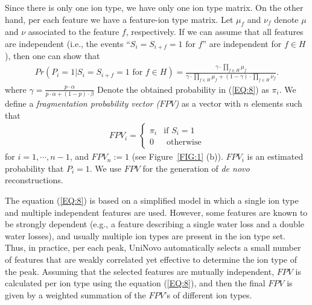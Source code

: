 Since there is only one ion type, we have only one ion type matrix.  On the other hand, per each feature we have a feature-ion type matrix. Let $\mu_f$ and $\nu_f$ denote $\mu$ and $\nu$ associated to the feature $f$, respectively. If we can assume that all features are independent (i.e., the events ``$S_i= S_{i+f}=1\text{ for }f$'' are independent for $f\in H$), then one can show that   
\begin{align}
Pr(P_i=1|S_i= S_{i+f}=1\text{ for }f\in H)=\frac{\gamma\cdot\prod\limits_{f\in H} \mu_f}{\gamma\cdot\prod\limits_{f\in H} \mu_f + (1-\gamma)\cdot\prod\limits_{f\in H} \nu_f}.\label{EQ:8}
\end{align}
where $\gamma=\frac{ p\cdot \alpha}{ p \cdot\alpha+ (1-p) \cdot \beta}$ 
Denote the obtained probability in (\ref{EQ:8}) as $\pi_i$. We define a {\em fragmentation probability vector ($FPV$)} as a vector with $n$ elements such that
\begin{align}
FPV_i=
\begin{cases}
\pi_i&\text{if $S_i=1$}\\
0&\text{ otherwise}
\end{cases}\label{EQ:9}
\end{align}
for $i=1,\cdots,n-1$, and $FPV_n:=1$ (see Figure~\ref{FIG:1} (b)). $FPV_i$ is an estimated probability that $P_i=1$.
We use $FPV$ for the generation of {\em de novo} reconstructions.

The equation (\ref{EQ:8}) is based on a simplified model in which a single ion type and multiple independent features are used. However, some features are known to be strongly dependent (e.g., a feature describing a single water loss and a double water losses), and usually multiple ion types are present in the ion type set. Thus, in practice, per each peak, UniNovo automatically selects a small number of features 
that are weakly correlated yet effective to determine the ion type of the peak.
 Assuming that the selected features are mutually independent, $FPV$ is calculated per ion type using the equation (\ref{EQ:8}), and then the final $FPV$ is given by a weighted summation of the $FPV$'s of different ion types. 



